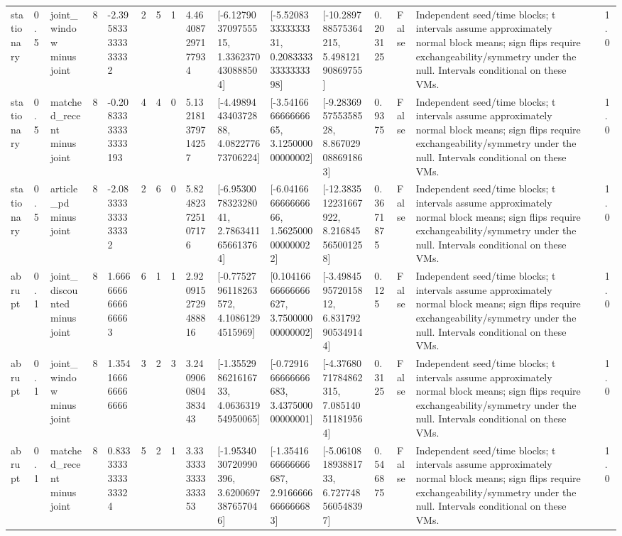 \begin{tabular}{lllllllllllllllll}
stationary & 0.5 & joint\_window minus joint & 8 & -2.395833333333332 & 2 & 5 & 1 & 4.464087297177934 & [-6.127903709755515, 1.3362370430888504] & [-5.520833333333331, 0.20833333333333398] & [-10.289788575364215, 5.49812190869755] & 0.203125 & False & Independent seed/time blocks; t intervals assume approximately normal block means; sign flips require exchangeability/symmetry under the null. Intervals conditional on these VMs. &  & 1.0 \\
stationary & 0.5 & matched\_recent minus joint & 8 & -0.20833333333333193 & 4 & 4 & 0 & 5.132181379714257 & [-4.498944340372888, 4.082277673706224] & [-3.541666666666665, 3.125000000000002] & [-9.283695755358528, 8.867029088691863] & 0.9375 & False & Independent seed/time blocks; t intervals assume approximately normal block means; sign flips require exchangeability/symmetry under the null. Intervals conditional on these VMs. &  & 1.0 \\
stationary & 0.5 & article\_pd minus joint & 8 & -2.083333333333332 & 2 & 6 & 0 & 5.824823725107176 & [-6.953007832328041, 2.7863411656613764] & [-6.041666666666666, 1.5625000000000022] & [-12.383512231667922, 8.216845565001258] & 0.3671875 & False & Independent seed/time blocks; t intervals assume approximately normal block means; sign flips require exchangeability/symmetry under the null. Intervals conditional on these VMs. &  & 1.0 \\
abrupt & 0.1 & joint\_discounted minus joint & 8 & 1.6666666666666663 & 6 & 1 & 1 & 2.9209152729488816 & [-0.7752796118263572, 4.10861294515969] & [0.10416666666666627, 3.750000000000002] & [-3.498459572015812, 6.831792905349144] & 0.125 & False & Independent seed/time blocks; t intervals assume approximately normal block means; sign flips require exchangeability/symmetry under the null. Intervals conditional on these VMs. &  & 1.0 \\
abrupt & 0.1 & joint\_window minus joint & 8 & 1.354166666666666 & 3 & 2 & 3 & 3.2409060804383443 & [-1.355298621616733, 4.063631954950065] & [-0.7291666666666683, 3.437500000000001] & [-4.3768071784862315, 7.085140511819564] & 0.3125 & False & Independent seed/time blocks; t intervals assume approximately normal block means; sign flips require exchangeability/symmetry under the null. Intervals conditional on these VMs. &  & 1.0 \\
abrupt & 0.1 & matched\_recent minus joint & 8 & 0.8333333333333324 & 5 & 2 & 1 & 3.3333333333333353 & [-1.9534030720990396, 3.6200697387657046] & [-1.3541666666666687, 2.9166666666666683] & [-5.061081893881733, 6.727748560548397] & 0.546875 & False & Independent seed/time blocks; t intervals assume approximately normal block means; sign flips require exchangeability/symmetry under the null. Intervals conditional on these VMs. &  & 1.0 \\

\end{tabular}
